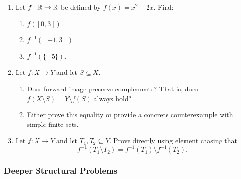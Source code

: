 \begin{enumerate}[resume]
\item Let $f: \mathbb{R} \to \mathbb{R}$ be defined by $f(x) = x^2 - 2x$. Find:
\begin{enumerate}[label=(\alph*)]
\item $f([0, 3])$.
\item $f^{-1}([-1, 3])$.
\item $f^{-1}(\{-5\})$.
\end{enumerate}

\item Let $f: X \to Y$ and let $S \subseteq X$.
\begin{enumerate}[label=(\alph*)]
\item Does forward image preserve complements? That is, does $f(X \setminus S) = Y \setminus f(S)$ always hold?
\item Either prove this equality or provide a concrete counterexample with simple finite sets.
\end{enumerate}

\item Let $f: X \to Y$ and let $T_1, T_2 \subseteq Y$. Prove directly using element chasing that
\[
f^{-1}(T_1 \setminus T_2) = f^{-1}(T_1) \setminus f^{-1}(T_2).
\]
\end{enumerate}

\subsubsection*{Deeper Structural Problems}

